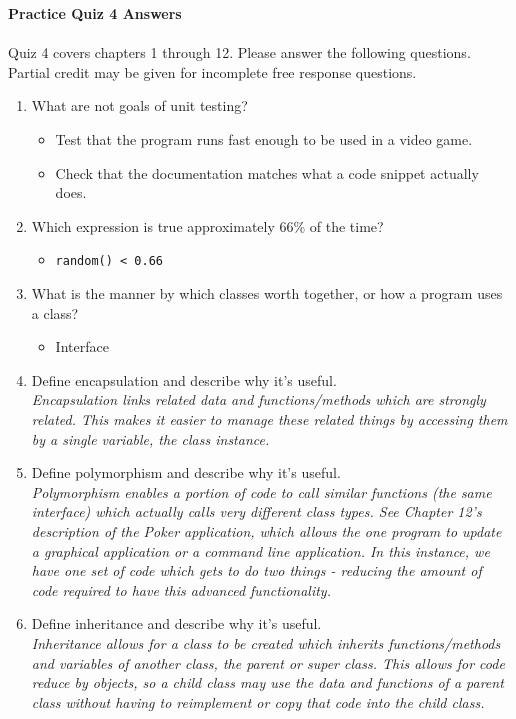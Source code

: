 \documentclass[letter,10pt]{article}
\newcommand*\tick{\item[\Checkmark]}
\begin{document}
\huge
\textbf{Practice Quiz 4 Answers}
\normalsize

\paragraph{}Quiz 4 covers chapters 1 through 12. Please answer the following questions. Partial credit may be given for incomplete free response questions.

\begin{enumerate}
    \item What are not goals of unit testing?
    \begin{itemize}
        \tick Test that the program runs fast enough to be used in a video game.
        \tick Check that the documentation matches what a code snippet actually does.
    \end{itemize}

    \item Which expression is true approximately 66\% of the time?
    \begin{itemize}
        \tick \verb|random() < 0.66|
    \end{itemize}
    
    \item What is the manner by which classes worth together, or how a program uses a class?
    \begin{itemize}
	\tick Interface
    \end{itemize}
    
    \item Define encapsulation and describe why it's useful. \\
    \textit{Encapsulation links related data and functions/methods which are strongly related. This makes it easier to manage these related things by accessing them by a single variable, the class instance.}
    
    \item Define polymorphism and describe why it's useful. \\
    \textit{Polymorphism enables a portion of code to call similar functions (the same interface) which actually calls very different class types. See Chapter 12's description of the Poker application, which allows the one program to update a graphical application or a command line application. In this instance, we have one set of code which gets to do two things - reducing the amount of code required to have this advanced functionality.}
    
    \item Define inheritance and describe why it's useful. \\
    \textit{Inheritance allows for a class to be created which inherits functions/methods and variables of another class, the parent or super class. This allows for code reduce by objects, so a child class may use the data and functions of a parent class without having to reimplement or copy that code into the child class.}
    

\end{enumerate}
\end{document}
